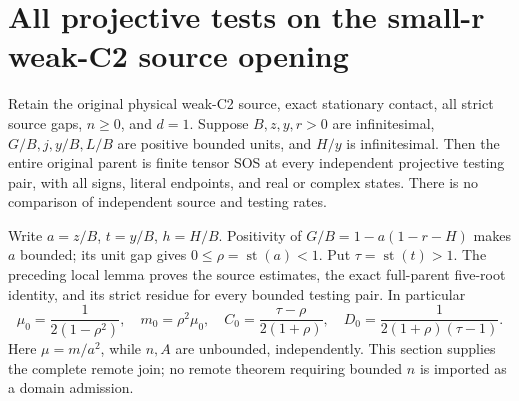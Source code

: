 \section{All projective tests on the small-r weak-C2 source opening}
\label{sec:r11-small-r-remote}
\begin{theorem}
Retain the original physical weak-C2 source, exact stationary contact,
all strict source gaps, $n\ge0$, and $d=1$. Suppose $B,z,y,r>0$
are infinitesimal, $G/B,j,y/B,L/B$ are positive bounded units,
and $H/y$ is infinitesimal. Then the entire original parent is
finite tensor SOS at every independent projective testing pair,
with all signs, literal endpoints, and real or complex states.
There is no comparison of independent source and testing rates.
\end{theorem}
Write $a=z/B$, $t=y/B$, $h=H/B$. Positivity of
$G/B=1-a(1-r-H)$ makes $a$ bounded; its unit gap gives
$0\le\rho=\operatorname{st}(a)<1$. Put
$\tau=\operatorname{st}(t)>1$. The preceding local lemma proves
the source estimates, the exact full-parent five-root identity,
and its strict residue for every bounded testing pair. In particular
\[
 \mu_0=\frac1{2(1-\rho^2)},\quad m_0=\rho^2\mu_0,\quad
 C_0=\frac{\tau-\rho}{2(1+\rho)},\quad
 D_0=\frac1{2(1+\rho)(\tau-1)}.                 \tag{SR1}
\]
Here $\mu=m/a^2$, while $n,A$ are unbounded, independently.
This section supplies the complete remote join; no remote theorem
requiring bounded $n$ is imported as a domain admission.

